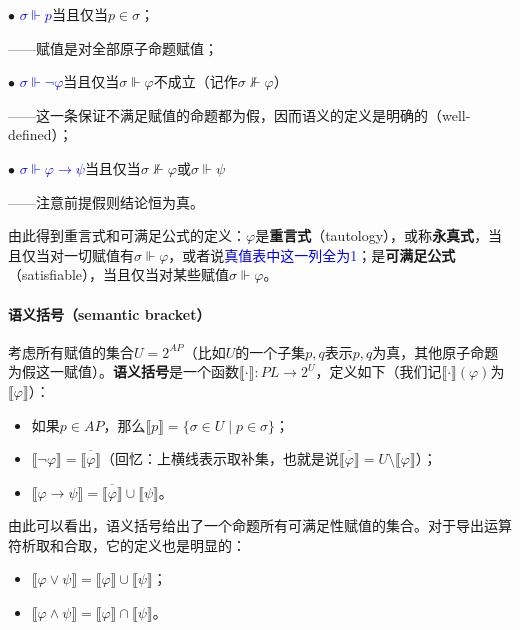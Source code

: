 \documentclass[b5paper,oneside]{ctexbook}
\newcommand{\Blue}[1]{\textcolor[named]{blue}{#1}}
\begin{document}
$\bullet$ \Blue{$\sigma\Vdash p$}当且仅当$p\in\sigma$；

——赋值是对全部原子命题赋值；

$\bullet$ \Blue{$\sigma\Vdash \neg\varphi$}当且仅当$\sigma\Vdash\varphi$不成立（记作$\sigma\not\Vdash\varphi$）

——这一条保证不满足赋值的命题都为假，因而语义的定义是明确的（well-defined）；

$\bullet$ \Blue{$\sigma\Vdash\varphi\rightarrow\psi$}当且仅当$\sigma\not\Vdash\varphi$或$\sigma\Vdash\psi$

——注意前提假则结论恒为真。

由此得到重言式和可满足公式的定义：$\varphi$是\textbf{重言式}（tautology），或称\textbf{永真式}，当且仅当对一切赋值有$\sigma\Vdash\varphi$，或者说\Blue{真值表中这一列全为1}；是\textbf{可满足公式}（satisfiable），当且仅当对某些赋值$\sigma\Vdash\varphi$。

\paragraph{语义括号（semantic bracket）}考虑所有赋值的集合$U=2^{AP}$（比如$U$的一个子集$p,q$表示$p,q$为真，其他原子命题为假这一赋值）。\textbf{语义括号}是一个函数$\llbracket\cdot\rrbracket\colon PL\rightarrow 2^U$，定义如下（我们记$\llbracket\cdot\rrbracket (\varphi )$为$\llbracket \varphi\rrbracket$）：
\begin{itemize}
\item 如果$p\in AP$，那么$\llbracket p\rrbracket =\{\sigma\in U\mid p\in\sigma\}$；
\item $\llbracket\neg\varphi\rrbracket=\overline{\llbracket\varphi\rrbracket}$（回忆：上横线表示取补集，也就是说$\overline{\llbracket\varphi\rrbracket}=U\setminus \llbracket\varphi\rrbracket$）；
\item $\llbracket\varphi\to\psi\rrbracket =\overline{\llbracket\varphi\rrbracket}\cup\llbracket\psi\rrbracket$。
\end{itemize}

由此可以看出，语义括号给出了一个命题所有可满足性赋值的集合。对于导出运算符析取和合取，它的定义也是明显的：
\begin{itemize}
\item $\llbracket\varphi\lor\psi\rrbracket =\llbracket\varphi\rrbracket\cup\llbracket\psi\rrbracket$；
\item $\llbracket\varphi\land\psi\rrbracket =\llbracket\varphi\rrbracket\cap\llbracket\psi\rrbracket$。
\end{itemize}
\end{document}
